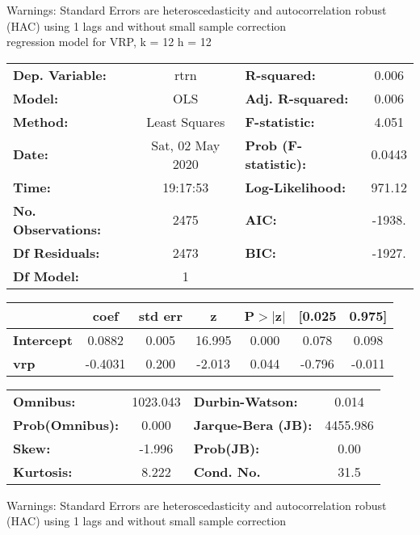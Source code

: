Warnings: \newline
 [1] Standard Errors are heteroscedasticity and autocorrelation robust (HAC) using 1 lags and without small sample correction\\ 

regression model for VRP, k = 12 h = 12\begin{center}
\begin{tabular}{lclc}
\toprule
\textbf{Dep. Variable:}    &       rtrn       & \textbf{  R-squared:         } &     0.006   \\
\textbf{Model:}            &       OLS        & \textbf{  Adj. R-squared:    } &     0.006   \\
\textbf{Method:}           &  Least Squares   & \textbf{  F-statistic:       } &     4.051   \\
\textbf{Date:}             & Sat, 02 May 2020 & \textbf{  Prob (F-statistic):} &   0.0443    \\
\textbf{Time:}             &     19:17:53     & \textbf{  Log-Likelihood:    } &    971.12   \\
\textbf{No. Observations:} &        2475      & \textbf{  AIC:               } &    -1938.   \\
\textbf{Df Residuals:}     &        2473      & \textbf{  BIC:               } &    -1927.   \\
\textbf{Df Model:}         &           1      & \textbf{                     } &             \\
\bottomrule
\end{tabular}
\begin{tabular}{lcccccc}
                   & \textbf{coef} & \textbf{std err} & \textbf{z} & \textbf{P$> |$z$|$} & \textbf{[0.025} & \textbf{0.975]}  \\
\midrule
\textbf{Intercept} &       0.0882  &        0.005     &    16.995  &         0.000        &        0.078    &        0.098     \\
\textbf{vrp}       &      -0.4031  &        0.200     &    -2.013  &         0.044        &       -0.796    &       -0.011     \\
\bottomrule
\end{tabular}
\begin{tabular}{lclc}
\textbf{Omnibus:}       & 1023.043 & \textbf{  Durbin-Watson:     } &    0.014  \\
\textbf{Prob(Omnibus):} &   0.000  & \textbf{  Jarque-Bera (JB):  } & 4455.986  \\
\textbf{Skew:}          &  -1.996  & \textbf{  Prob(JB):          } &     0.00  \\
\textbf{Kurtosis:}      &   8.222  & \textbf{  Cond. No.          } &     31.5  \\
\bottomrule
\end{tabular}
\end{center}

Warnings: \newline
 [1] Standard Errors are heteroscedasticity and autocorrelation robust (HAC) using 1 lags and without small sample correction\\ 

